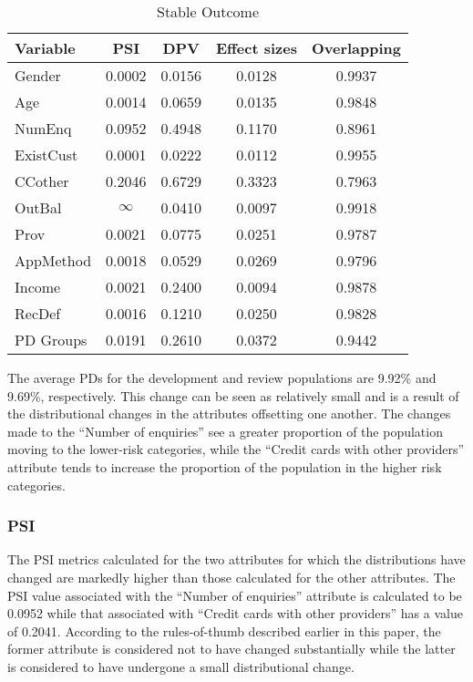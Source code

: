 \documentclass{article}
\theoremstyle{def}
\begin{document}
\begin{table}[!htbp!]%
\caption{Stable Outcome}
\label{tabl:Stable_out}
\centering
\small
\begin{tabular}{lcccc}
\hline
Variable & PSI & DPV & Effect sizes & Overlapping\\
\hline
Gender & 0.0002 & 0.0156 & 0.0128 & 0.9937\\
Age & 0.0014 & 0.0659 & 0.0135 & 0.9848\\
NumEnq & 0.0952 & 0.4948 & 0.1170 & 0.8961\\
ExistCust & 0.0001 & 0.0222 & 0.0112 & 0.9955\\
CCother & 0.2046 & 0.6729 & 0.3323 & 0.7963\\
OutBal & $\infty$ & 0.0410 & 0.0097 & 0.9918\\
Prov & 0.0021 & 0.0775 & 0.0251 & 0.9787\\
AppMethod & 0.0018 & 0.0529 & 0.0269 & 0.9796\\
Income & 0.0021 & 0.2400 & 0.0094 & 0.9878\\
RecDef & 0.0016 & 0.1210 & 0.0250 & 0.9828\\
\hline
PD Groups & 0.0191 & 0.2610 & 0.0372 & 0.9442\\
\hline
\end{tabular}
\end{table}

The average PDs for the development and review populations are 9.92\% and 9.69\%, respectively.
This change can be seen as relatively small and is a result of the distributional changes in the attributes offsetting one another. The changes made to the ``Number of enquiries'' see a greater proportion of the population moving to the lower-risk categories, while the ``Credit cards with other providers'' attribute tends to increase the proportion of the population in the higher risk categories.

\subsubsection{PSI}

The PSI metrics calculated for the two attributes for which the distributions have changed are markedly higher than those calculated for the other attributes. The PSI value associated with the ``Number of enquiries'' attribute is calculated to be 0.0952 while that associated with ``Credit cards with other providers'' has a value of 0.2041. According to the rules-of-thumb described earlier in this paper, the former attribute is considered not to have changed substantially while the latter is considered to have undergone a small distributional change. %
\end{document}
